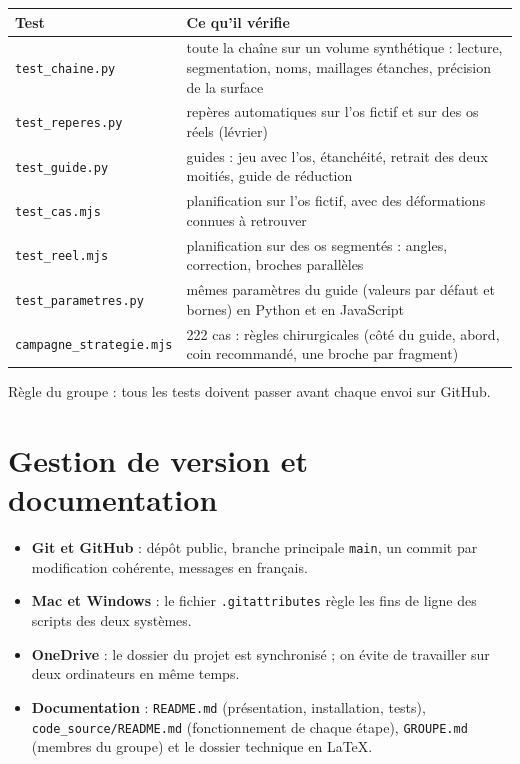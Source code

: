 \documentclass[11pt,a4paper]{article}
\newcommand{\fichier}[1]{\texttt{\small #1}}
\begin{document}
\begin{longtable}{@{}p{5cm}p{10.2cm}@{}}
\toprule
\textbf{Test} & \textbf{Ce qu'il vérifie} \\ \midrule \endhead
\fichier{test\_chaine.py} & toute la chaîne sur un volume synthétique : lecture, segmentation, noms, maillages étanches,
  précision de la surface \\ \midrule
\fichier{test\_reperes.py} & repères automatiques sur l'os fictif et sur des os réels (lévrier) \\ \midrule
\fichier{test\_guide.py} & guides : jeu avec l'os, étanchéité, retrait des deux moitiés, guide de réduction \\ \midrule
\fichier{test\_cas.mjs} & planification sur l'os fictif, avec des déformations connues à retrouver \\ \midrule
\fichier{test\_reel.mjs} & planification sur des os segmentés : angles, correction, broches parallèles \\ \midrule
\fichier{test\_parametres.py} & mêmes paramètres du guide (valeurs par défaut et bornes) en Python et en JavaScript \\ \midrule
\fichier{campagne\_strategie.mjs} & 222 cas : règles chirurgicales (côté du guide, abord, coin recommandé, une broche
  par fragment) \\
\bottomrule
\end{longtable}

Règle du groupe : tous les tests doivent passer avant chaque envoi sur GitHub.

\section{Gestion de version et documentation}

\begin{itemize}
  \item \textbf{Git et GitHub} : dépôt public, branche principale \fichier{main}, un commit par modification cohérente,
        messages en français.
  \item \textbf{Mac et Windows} : le fichier \fichier{.gitattributes} règle les fins de ligne des scripts des deux
        systèmes.
  \item \textbf{OneDrive} : le dossier du projet est synchronisé ; on évite de travailler sur deux ordinateurs en même
        temps.
  \item \textbf{Documentation} : \fichier{README.md} (présentation, installation, tests), \fichier{code\_source/README.md}
        (fonctionnement de chaque étape), \fichier{GROUPE.md} (membres du groupe) et le dossier technique en LaTeX.
\end{itemize}
\end{document}
